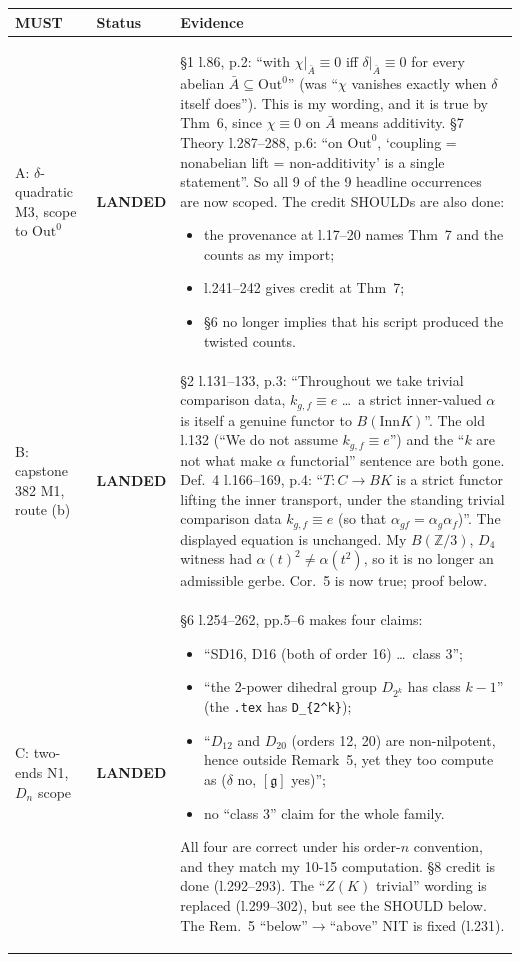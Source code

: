 \documentclass[10pt]{article}
\newcommand{\Out}{\mathrm{Out}}
\newcommand{\Inn}{\mathrm{Inn}}
\newcommand{\Abar}{\bar A}
\newcommand{\st}[1]{\textbf{#1}}
\begin{document}
\begin{tabular}{>{\raggedright}p{2.6cm}>{\raggedright}p{1.75cm}p{11.4cm}}
\toprule
MUST & Status & Evidence\\
\midrule
A: $\delta$-quadratic M3, scope to $\Out^0$ & \st{LANDED} &
\S1 l.86, p.2: ``with $\chi|_{\Abar}\equiv0$ iff $\delta|_{\Abar}\equiv0$ for every abelian $\Abar\subseteq\Out^0$'' (was ``$\chi$ vanishes exactly when $\delta$ itself does''). This is my wording, and it is true by Thm~6, since $\chi\equiv0$ on $\Abar$ means additivity.
\S7 Theory l.287--288, p.6: ``on $\Out^0$, `coupling = nonabelian lift = non-additivity' is a single statement''.
So all 9 of the 9 headline occurrences are now scoped.
The credit SHOULDs are also done:
\begin{itemize}
\item the provenance at l.17--20 names Thm~7 and the counts as my import;
\item l.241--242 gives credit at Thm~7;
\item \S6 no longer implies that his script produced the twisted counts.
\end{itemize}\\
\midrule
B: capstone 382 M1, route (b) & \st{LANDED} &
\S2 l.131--133, p.3: ``Throughout we take trivial comparison data, $k_{g,f}\equiv e$ \dots\ a strict inner-valued $\alpha$ is itself a genuine functor to $B(\Inn K)$''.
The old l.132 (``We do not assume $k_{g,f}\equiv e$'') and the ``$k$ are not what make $\alpha$ functorial'' sentence are both gone.
Def.~4 l.166--169, p.4: ``$T\colon C\to BK$ is a strict functor lifting the inner transport, under the standing trivial comparison data $k_{g,f}\equiv e$ (so that $\alpha_{gf}=\alpha_g\alpha_f$)''. The displayed equation is unchanged.
My $B(\mathbb Z/3)$, $D_4$ witness had $\alpha(t)^2\ne\alpha(t^2)$, so it is no longer an admissible gerbe. Cor.~5 is now true; proof below.\\
\midrule
C: two-ends N1, $D_n$ scope & \st{LANDED} &
\S6 l.254--262, pp.5--6 makes four claims:
\begin{itemize}
\item ``SD16, D16 (both of order 16) \dots\ class 3'';
\item ``the 2-power dihedral group $D_{2^k}$ has class $k-1$'' (the \texttt{.tex} has \verb|D_{2^k}|);
\item ``$D_{12}$ and $D_{20}$ (orders 12, 20) are non-nilpotent, hence outside Remark~5, yet they too compute as ($\delta$ no, $[\mathfrak g]$ yes)'';
\item no ``class 3'' claim for the whole family.
\end{itemize}
All four are correct under his order-$n$ convention, and they match my 10-15 computation.
\S8 credit is done (l.292--293).
The ``$Z(K)$ trivial'' wording is replaced (l.299--302), but see the SHOULD below.
The Rem.~5 ``below''$\to$``above'' NIT is fixed (l.231).\\
\bottomrule
\end{tabular}
\end{document}
